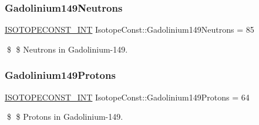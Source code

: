 \subsubsection{\texorpdfstring{Gadolinium149\+Neutrons}{Gadolinium149Neutrons}}
{\footnotesize\ttfamily \mbox{\hyperlink{group___isotope_const-_macros_ga5f18360b3e99483a35c32d789e62621c}{I\+S\+O\+T\+O\+P\+E\+C\+O\+N\+S\+T\+\_\+\+I\+NT}} Isotope\+Const\+::\+Gadolinium149\+Neutrons = 85}

\$ \$ Neutrons in Gadolinium-\/149. \mbox{\label{group___isotope_const-_gadolinium-_gd149_ga38189f9fd34c46d5a16899d047b986ea}} 
\subsubsection{\texorpdfstring{Gadolinium149\+Protons}{Gadolinium149Protons}}
{\footnotesize\ttfamily \mbox{\hyperlink{group___isotope_const-_macros_ga5f18360b3e99483a35c32d789e62621c}{I\+S\+O\+T\+O\+P\+E\+C\+O\+N\+S\+T\+\_\+\+I\+NT}} Isotope\+Const\+::\+Gadolinium149\+Protons = 64}

\$ \$ Protons in Gadolinium-\/149. 